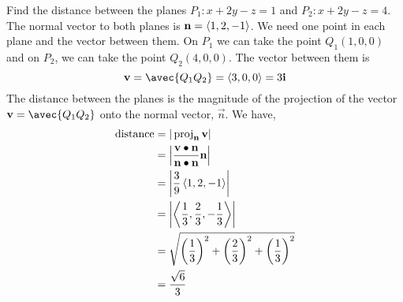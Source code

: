 \documentclass[handout]{ximera}
\begin{document}
\begin{example}
Find the distance between the planes $P_1: x +2y - z = 1$ and $P_2: x+2y-z = 4$.\\
The normal vector to both planes is $\mathbf{n} = \left\langle 1, 2, -1\right\rangle$. We need one point in each plane and the vector between them.
On $P_1$ we can take the point $Q_1(1, 0, 0)$ and on $P_2$, we can take the point $Q_2(4, 0, 0)$. The vector between them is 
\[
\vec{v} = \avec{Q_1Q_2} = \vector{3,0,0} = 3\vec{i}
\]
The distance between the planes is the magnitude of the projection of the vector $\vec{v} = \avec{Q_1Q_2}$ onto the normal vector, $\vec{n}$. We have,
\begin{align*}
\text{distance} &= | \operatorname{proj}_{\mathbf{n}}\mathbf{v}| \\
               &= \left| \frac{\mathbf{v}\bullet \mathbf{n}}{\mathbf{n}\bullet \mathbf{n}} \mathbf{n}\right|\\
               &= \left|\frac{3}{9} \left\langle 1, 2, -1\right\rangle\right|\\
               &= \left| \left\langle \frac13, \frac23, -\frac13\right\rangle\right|\\
               &= \sqrt{\left( \frac13\right)^2 + \left( \frac23\right)^2 + \left( \frac13\right)^2}\\
               & = \frac{\sqrt{6}}{3}
\end{align*}
\end{example}

\begin{image}
\end{image}
\end{document}
